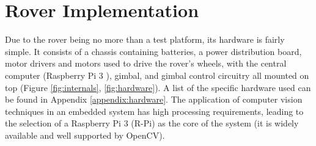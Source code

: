 \chapter{Rover Implementation}
\label{chapter:rover}

Due to the rover being no more than a test platform, its hardware is fairly simple. It consists of a chassis containing batteries, a power distribution board, motor drivers and motors used to drive the rover's wheels, with the central computer (Raspberry Pi 3 \cite{pi}), gimbal, and gimbal control circuitry all mounted on top (Figure \ref{fig:internals}, \ref{fig:hardware}). A list of the specific hardware used can be found in Appendix \ref{appendix:hardware}. The application of computer vision techniques in an embedded system has high processing requirements, leading to the selection of a Raspberry Pi 3 (R-Pi) as the core of the system (it is widely available and well supported by OpenCV).

